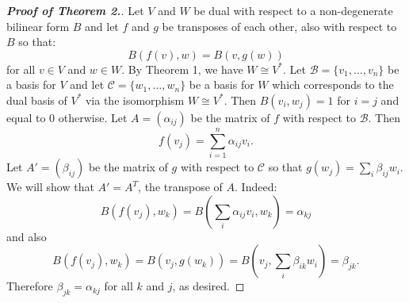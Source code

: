 \documentclass[12pt]{article}
\theoremstyle{definition}
\begin{document}
\begin{proof}[{\bf Proof of Theorem 2.}]
Let $V$ and $W$ be dual with respect to a non-degenerate bilinear
form $B$ and let $f$ and $g$ be transposes of each other, also
with respect to $B$ so that:
$$B(f(v),w)=B(v,g(w))$$
for all $v\in V$ and $w \in W$. By Theorem 1, we have $W\cong V^\ast$. Let
$\mathcal{B}=\{v_1,\ldots,v_n\}$ be a basis for $V$ and let
$\mathcal{C}=\{w_1,\ldots,w_n\}$ be a basis for $W$ which
corresponds to the dual basis of $V^\ast$ via the isomorphism $W\cong V^\ast$. Then $B(v_i,w_j)=1$
for $i=j$ and equal to $0$ otherwise. Let $A=(\alpha_{ij})$ be the
matrix of $f$ with respect to $\mathcal{B}$. Then
$$f(v_j)=\sum_{i=1}^n \alpha_{ij}v_i.$$
Let $A'=(\beta_{ij})$ be the matrix of $g$ with respect to
$\mathcal{C}$ so that $g(w_j)=\sum_i \beta_{ij}w_i$. We will
show that $A'=A^T$, the transpose of $A$. Indeed:
$$B(f(v_j),w_k)=B(\sum_i \alpha_{ij}v_i,w_k)=\alpha_{kj}$$
and also
$$B(f(v_j),w_k)=B(v_j,g(w_k))=B(v_j,\sum_i
\beta_{ik}w_i)=\beta_{jk}.$$ Therefore $\beta_{jk}=\alpha_{kj}$
for all $k$ and $j$, as desired.
\end{proof}
\end{document}
